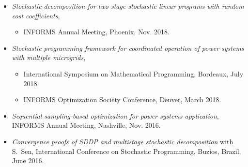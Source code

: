 \documentclass[hyperref, margin]{myResume}
\begin{document}
\begin{resume}
\begin{itemize}[leftmargin=*]
\begin{itemize}
		\end{itemize}
		\item \textit{Stochastic decomposition for two-stage stochastic linear programs with random cost coefficients},
		\begin{itemize}
			\item INFORMS Annual Meeting, Phoenix, Nov. 2018.
		\end{itemize}
		\item \textit{Stochastic programming framework for coordinated operation of power systems with multiple microgrids},
		\begin{itemize}[leftmargin=1em]
			\item International Symposium on Mathematical Programming, Bordeaux, July 2018.
			\item INFORMS Optimization Society Conference, Denver, March 2018.		
		\end{itemize}
		\item \textit{Sequential sampling-based optimization for power systems application}, INFORMS Annual Meeting, Nashville, Nov. 2016.
		\item \textit{Convergence proofs of SDDP and multistage stochastic decomposition} with S.\ Sen, International Conference on Stochastic Programming, Buzios, Brazil, June 2016.

\end{itemize}
\end{resume}
\end{document}
